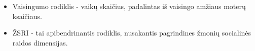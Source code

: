 \begin{itemize}
    \item Vaisingumo rodiklis - vaikų skaičius, padalintas iš vaisingo amžiaus moterų ksaičiaus.
    \item ŽSRI - tai apibendrinantis rodiklis, nusakantis pagrindines žmonių socialinės raidos dimensijas.
\end{itemize}